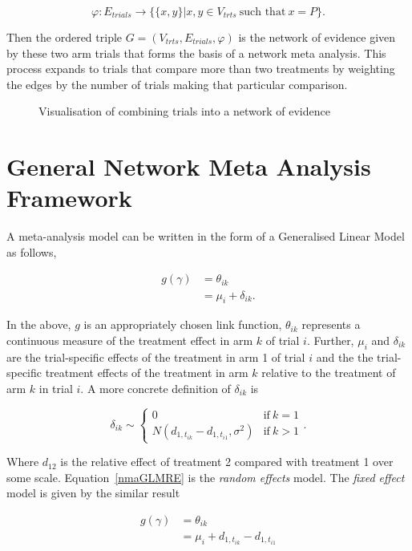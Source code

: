 \[
    \varphi : E_{trials} \to \{ \{x, y \} | x, y \in V_{trts} \ \text{such that} \ x = P \}
.\] 

Then the ordered triple $G = (V_{trts}, E_{trials}, \varphi)$ is the network of evidence given by these two arm trials that forms the basis of a network meta analysis. This process expands to trials that compare more than two treatments by weighting the edges by the number of trials making that particular comparison.

\begin{figure}[h]
    \centering
    
    \caption{Visualisation of combining trials into a network of evidence}
    \label{comb_evi}
\end{figure}

\section{General Network Meta Analysis Framework}
A meta-analysis model can be written in the form of a Generalised Linear Model as follows,

\begin{align}
    g(\gamma) &= \theta_{ik} \nonumber \\
              &= \mu_i + \delta_{ik}. 
    \label{nmaGLMRE}
\end{align}

In the above, $g$ is an appropriately chosen link function, $\theta_{ik}$ represents a continuous measure of the treatment effect in arm $k$ of trial $i$. Further, $\mu_i$ and $\delta_{ik}$ are the trial-specific effects of the treatment in arm 1 of trial $i$ and the the trial-specific treatment effects of the treatment in arm $k$ relative to the treatment of arm $k$ in trial $i$. A more concrete definition of $\delta_{ik}$ is 

\[
    \delta_{ik} \sim \begin{cases}
        0 & \text{if} \ k = 1 \\ 
        N(d_{1,t_{ik}} - d_{1,t_{i1}}, \sigma^2) & \text{if} \ k > 1
    \end{cases}.  
\]

Where $d_{12}$ is the relative effect of treatment 2 compared with treatment 1 over some scale. Equation~\ref{nmaGLMRE} is the \textit{random effects} model. The \textit{fixed effect} model is given by the similar result

\begin{align}
    g(\gamma) &= \theta_{ik} \\
              &= \mu_i + d_{1,t_{ik}} - d_{1,t_{i1}}   
\end{align}

